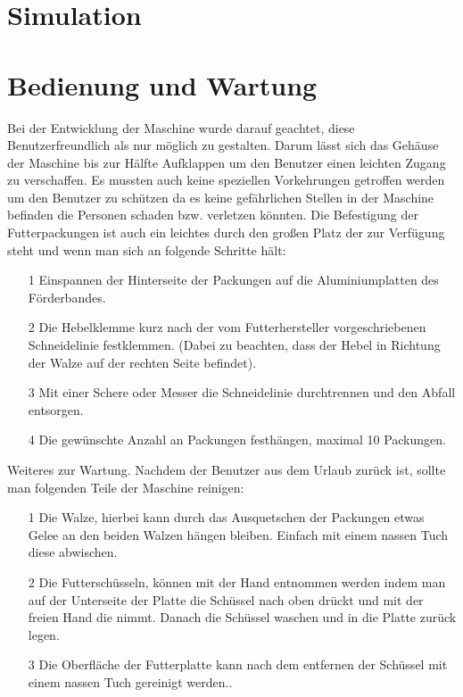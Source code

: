 \section{Simulation}

	
\section{Bedienung und Wartung}

Bei der Entwicklung der Maschine wurde darauf geachtet, diese Benutzerfreundlich als nur möglich zu gestalten. Darum lässt sich das Gehäuse der Maschine bis zur Hälfte Aufklappen um den Benutzer einen leichten Zugang zu verschaffen. Es mussten auch keine speziellen Vorkehrungen getroffen werden um den Benutzer zu schützen da es keine gefährlichen Stellen in der Maschine befinden die Personen schaden bzw. verletzen könnten. Die Befestigung der Futterpackungen ist auch ein leichtes durch den großen Platz der zur Verfügung steht und wenn man sich an folgende Schritte hält: 

\begin{itemize}
\item[1] Einspannen der Hinterseite der Packungen auf die Aluminiumplatten des Förderbandes. 
\item[2] Die Hebelklemme kurz nach der vom Futterhersteller vorgeschriebenen Schneidelinie festklemmen. (Dabei zu beachten, dass der Hebel in Richtung der Walze auf der rechten Seite befindet).
\item[3] Mit einer Schere oder Messer die Schneidelinie durchtrennen und den Abfall entsorgen.
\item[4] Die gewünschte Anzahl an Packungen festhängen, maximal 10 Packungen.
\end{itemize} 

Weiteres zur Wartung. Nachdem der Benutzer aus dem Urlaub zurück ist, sollte man folgenden Teile der Maschine reinigen: 

\begin{itemize}
\item[1] Die Walze, hierbei kann durch das Ausquetschen der Packungen etwas Gelee an den beiden Walzen hängen bleiben. Einfach mit einem nassen Tuch diese abwischen.
\item[2] Die Futterschüsseln, können mit der Hand entnommen werden indem man auf der Unterseite der Platte die Schüssel nach oben drückt und mit der freien Hand die nimmt. Danach die Schüssel waschen und in die Platte zurück legen.
\item[3] Die Oberfläche der Futterplatte kann nach dem entfernen der Schüssel mit einem nassen Tuch gereinigt werden..
\end{itemize}


